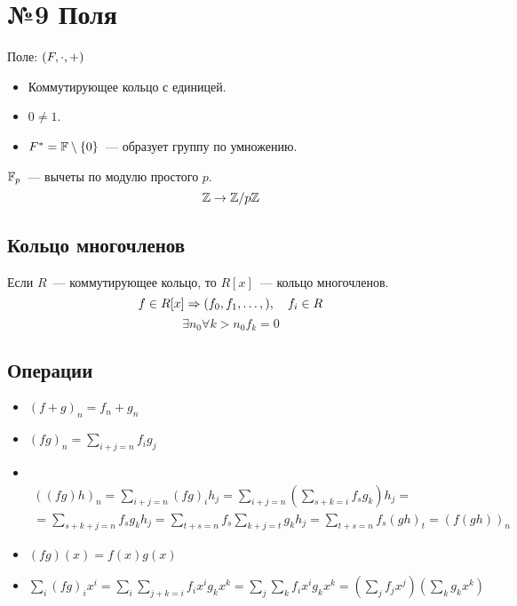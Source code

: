 \section{№9 Поля}

\begin{definition}
  Поле: $(F, \cdot, +)$
  \begin{itemize}
    \item Коммутирующее кольцо с единицей.
    \item $0 \neq 1$.
    \item $F^{*} = \mathbb{F} \setminus \{0\}$~--- образует группу по умножению.
  \end{itemize}
\end{definition}

\begin{definition}
  $\mathbb{F}_p$~--- вычеты по модулю простого $p$.
  \[\mathbb{Z} \rightarrow \mathbb{Z}/p\mathbb{Z}\]
\end{definition}

\subsection{Кольцо многочленов}

\begin{definition}
  Если $R$~--- коммутирующее кольцо, то $R[x]$~--- кольцо многочленов.
  \[f \in R[x] \Rightarrow (f_0, f_1, \dots, ), \quad f_i \in R\]
  \[\exists n_0 \forall k > n_0 f_k = 0\]
\end{definition}

\subsection{Операции}

\begin{itemize}
  \item $\displaystyle (f + g)_n = f_n + g_n$ \\
  \item $\displaystyle (f g)_n = \sum_{i + j = n} f_i g_j$ \\
  \item~ \begin{multline} ((fg)h)_n = \sum_{i + j = n}(fg)_i h_j = \sum_{i + j = n} (\sum_{s + k = i}f_s g_k)h_j = \\ = \sum_{s + k + j = n} f_s g_k h_j = \sum_{t + s = n} f_s \sum_{k + j = t}g_k h_j = \sum_{t + s = n}f_s(gh)_t = (f(gh))_n \end{multline}
  \item $(fg)(x) = f(x)g(x)$
  \item $\displaystyle \sum_{i}(fg)_i x^i = \sum_{i} \sum_{j + k = i} f_i x^i g_k x^k = \sum_{j} \sum_{k} f_i x^i g_k x^k = (\sum_j f_j x^j)(\sum_{k}g_k x^k)$
\end{itemize}

